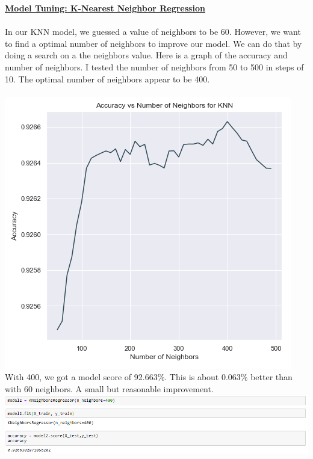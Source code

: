 \documentclass[11pt]{article}
\begin{document}
\underline{\textbf{Model Tuning: K-Nearest Neighbor Regression}}\\ \\
In our KNN model, we guessed a value of neighbors to be 60. However, we want to find a optimal number of neighbors to improve our model. We can do that by doing a search on a the neighbors value. Here is a graph of the accuracy and number of neighbors. I tested the number of neighbors from 50 to 500 in steps of 10. The optimal number of neighbors appear to be 400. \\ \\
\includegraphics[scale=0.65]{knn_tune} \\ 
With 400, we got a model score of 92.663\%. This is about 0.063\% better than with 60 neighbors. A small but reasonable improvement.\\

\includegraphics[scale=0.65]{model2} \\ 
\end{document}
